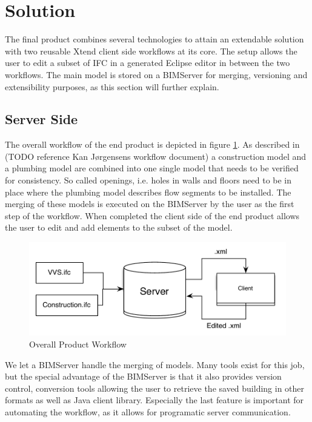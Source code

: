\section{Solution}
The final product combines several technologies to attain an extendable solution with two reusable Xtend client side workflows at its core. The setup allows the user to edit a subset of IFC in a generated Eclipse editor in between the two workflows. The main model is stored on a BIMServer for merging, versioning and extensibility purposes, as this section will further explain.

\subsection{Server Side}
The overall workflow of the end product is depicted in figure \ref{fig:overall_product_workflow}. As described in (TODO reference Kan Jørgensens workflow document) a construction model and a plumbing model are combined into one single model that needs to be verified for consistency. So called openings, i.e. holes in walls and floors need to be in place where the plumbing model describes flow segments to be installed. The merging of these models is executed on the BIMServer by the user as the first step of the workflow. When completed the client side of the end product allows the user to edit and add elements to the subset of the model.

\begin{figure}[htbp]
    \centering
        \includegraphics[width=120mm]{images/CompleteWorkflow.pdf}
    \caption{Overall Product Workflow}
    \label{fig:overall_product_workflow}
\end{figure}

We let a BIMServer handle the merging of models. Many tools exist for this job, but the special advantage of the BIMServer is that it also provides version control, conversion tools allowing the user to retrieve the saved building in other formats as well as Java client library. Especially the last feature is important for automating the workflow, as it allows for programatic server communication.

